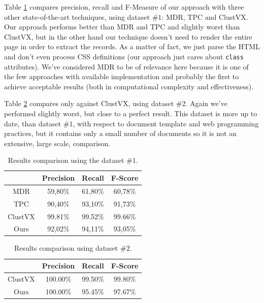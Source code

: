 \documentclass{vldb}
\begin{document}
Table \ref{table:compare1} compares precision, recall and F-Measure of our
approach with three other state-of-the-art techniques, using dataset $\#1$:
MDR\cite{MDR03}, TPC\cite{TPC09} and ClustVX\cite{clustVX2014}. Our approach performs better than
MDR and TPC and slightly worst than ClustVX, but in the other hand our technique
doesn't need to render the entire page in order to extract the records. As a
matter of fact, we just parse the HTML and don't even process CSS definitions
(our approach just cares about \texttt{class} attributes).
We've considered MDR to be of relevance here because it is one of the few
approaches with available implementation and probably the first to achieve
acceptable results (both in computational complexity and effectiveness).

Table \ref{table:compare2} compares only against ClustVX, using dataset $\#2$.
Again we've performed slightly worst, but close to a perfect result. This
dataset is more up to date, than dataset $\#1$, with respect to document
template and web programming practices, but it contains only a small number of
documents so it is not an extensive, large scale, comparison.

\begin{table}[h]
\centering
\caption{Results comparison using the dataset $\#1$.}
\label{table:compare1}
\begin{tabular}
{|c| c| c| c|}\hline
	& Precision	& Recall	& F-Score\\ \hline
MDR\cite{MDR03} &	59,80\%	& 61,80\%	& 60,78\%\\ \hline
TPC\cite{TPC09}	& 90,40\%	& 93,10\%	& 91,73\%\\ \hline
ClustVX\cite{clustVX2014} &	99.81\% & 99.52\% & 99.66\%\\ \hline
Ours &	92,02\%	& 94,11\%	& 93,05\% \\ \hline
\end{tabular}
\end{table}

\begin{table}[h]
\centering
\caption{Results comparison using dataset $\#2$.}
\label{table:compare2}
\begin{tabular}
{|c| c| c| c|}\hline
	& Precision	& Recall	& F-Score\\ \hline
ClustVX\cite{clustVX2014} &	100.00\% & 99.50\% & 99.80\%\\ \hline
Ours &	100.00\% & 95.45\% & 97.67\% \\ \hline
\end{tabular}
\end{table}
\end{document}
